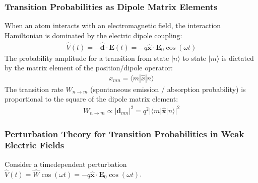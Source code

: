 \documentclass[letterpaper,10pt,english]{jupyterBook}
\begin{document}
\subsubsection{Transition Probabilities as Dipole Matrix Elements}
\label{\detokenize{ch/quantum-mechanics/history/heisenberg-reinterpretation:transition-probabilities-as-dipole-matrix-elements}}\label{\detokenize{ch/quantum-mechanics/history/heisenberg-reinterpretation:quantum-mechanics-history-heisenberg-reinterpretation-transition-dipole-matrix}}
\sphinxAtStartPar
When an atom interacts with an electromagnetic field, the interaction Hamiltonian is dominated by the electric dipole coupling:
\begin{equation*}
\begin{split}\hat{V}(t) = - \hat{\mathbf{d}} \cdot \mathbf{E}(t) = - q \hat{\mathbf{x}} \cdot \mathbf{E}_0 \cos(\omega t)\end{split}
\end{equation*}
\sphinxAtStartPar
The probability amplitude for a transition from state \(|n\rangle\) to state \(|m\rangle\) is dictated by the matrix element of the position/dipole operator:
\begin{equation*}
\begin{split}x_{mn} = \langle m | \hat{x} | n \rangle\end{split}
\end{equation*}
\sphinxAtStartPar
The transition rate \(W_{n \to m}\) (spontaneous emission / absorption probability) is proportional to the square of the dipole matrix element:
\begin{equation*}
\begin{split}W_{n \to m} \propto |\mathbf{d}_{mn}|^2 = q^2 |\langle m | \hat{\mathbf{x}} | n \rangle|^2\end{split}
\end{equation*}

\subsubsection{Perturbation Theory for Transition Probabilities in Weak Electric Fields}
\label{\detokenize{ch/quantum-mechanics/history/heisenberg-reinterpretation:perturbation-theory-for-transition-probabilities-in-weak-electric-fields}}\label{\detokenize{ch/quantum-mechanics/history/heisenberg-reinterpretation:quantum-mechanics-history-heisenberg-reinterpretation-transition-perturbation-theory}}
\sphinxAtStartPar
Consider a time\sphinxhyphen{}dependent perturbation \(\hat{V}(t) = \hat{W} \cos(\omega t) = -q \hat{\mathbf{x}} \cdot \mathbf{E}_0 \cos(\omega t)\).
\end{document}
